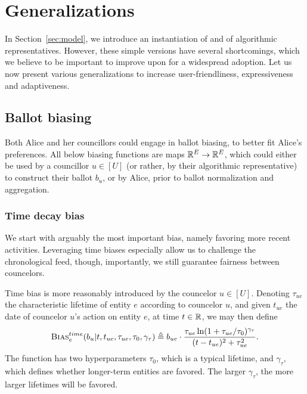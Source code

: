 \section{Generalizations}
\label{sec:generalizations}

In Section~\ref{sec:model}, 
we introduce an instantiation of \Veche{} and of algorithmic representatives.
However, these simple versions have several shortcomings,
which we believe to be important to improve upon for a widespread adoption.
Let us now present various generalizations to increase user-friendliness, 
expressiveness and adaptiveness.

\subsection{Ballot biasing}
\label{sec:biasing}

Both Alice and her councillors could engage in ballot biasing,
to better fit Alice's preferences.
All below biasing functions are maps $\mathbb R^E \to \mathbb R^E$,
which could either be used by a councillor $u \in [U]$ 
(or rather, by their algorithmic representative)
to construct their ballot $b_u$,
or by Alice, prior to ballot normalization and aggregation.

\subsubsection{Time decay bias}

We start with arguably the most important bias,
namely favoring more recent activities.
Leveraging time biases especially allow us to challenge the chronological feed,
though, importantly, we still guarantee fairness between councelors.

Time bias is more reasonably introduced by the councelor $u \in [U]$.
Denoting $\tau_{ue}$ the characteristic lifetime of entity $e$ according to councelor $u$,
and given $t_{ue}$ the date of councelor $u$'s action on entity $e$,
at time $t \in \mathbb R$, we may then define
\begin{align}
    \textsc{Bias}^{time}_e (b_{u} | t, t_{ue}, \tau_{ue}, \tau_0, \gamma_\tau)
    \triangleq b_{ue} \cdot \frac{
        \tau_{ue} \ln (1+\tau_{ue} / \tau_0)^{\gamma_\tau}
    }{
        (t - t_{ue})^2 + \tau_{ue}^2
    }.
\end{align}
The function has two hyperparameters $\tau_0$, 
which is a typical lifetime, and $\gamma_\tau$,
which defines whether longer-term entities are favored.
The larger $\gamma_\tau$, the more larger lifetimes will be favored.

